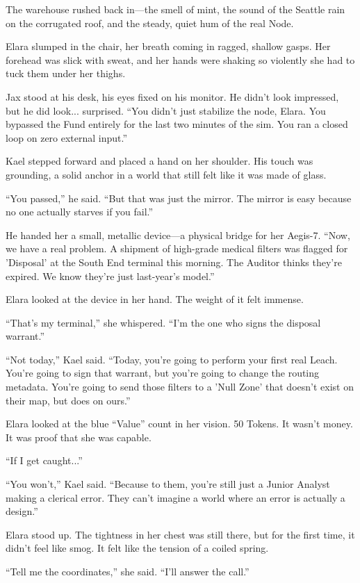 The warehouse rushed back in—the smell of mint, the sound of the Seattle rain on the corrugated roof, and the steady, quiet hum of the real Node. 

Elara slumped in the chair, her breath coming in ragged, shallow gasps. Her forehead was slick with sweat, and her hands were shaking so violently she had to tuck them under her thighs. 


Jax stood at his desk, his eyes fixed on his monitor. He didn't look impressed, but he did look... surprised. ``You didn't just stabilize the node, Elara. You bypassed the Fund entirely for the last two minutes of the sim. You ran a closed loop on zero external input.''

Kael stepped forward and placed a hand on her shoulder. His touch was grounding, a solid anchor in a world that still felt like it was made of glass. 

``You passed,'' he said. ``But that was just the mirror. The mirror is easy because no one actually starves if you fail.''

He handed her a small, metallic device—a physical bridge for her Aegis-7. ``Now, we have a real problem. A shipment of high-grade medical filters was flagged for 'Disposal' at the South End terminal this morning. The Auditor thinks they're expired. We know they're just last-year's model.''

Elara looked at the device in her hand. The weight of it felt immense. 

``That's my terminal,'' she whispered. ``I'm the one who signs the disposal warrant.''

``Not today,'' Kael said. ``Today, you’re going to perform your first real Leach. You’re going to sign that warrant, but you’re going to change the routing metadata. You’re going to send those filters to a 'Null Zone' that doesn't exist on their map, but does on ours.''

Elara looked at the blue ``Value'' count in her vision. 50 Tokens. It wasn't money. It was proof that she was capable. 

``If I get caught...''

``You won't,'' Kael said. ``Because to them, you're still just a Junior Analyst making a clerical error. They can't imagine a world where an error is actually a design.''

Elara stood up. The tightness in her chest was still there, but for the first time, it didn't feel like smog. It felt like the tension of a coiled spring. 

``Tell me the coordinates,'' she said. ``I'll answer the call.''